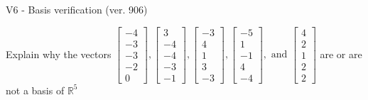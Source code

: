 \begin{exercise}
  \begin{exerciseTitle}V6 - Basis verification (ver. 906)\end{exerciseTitle}
  \begin{exerciseStatement}
    Explain why the vectors \(\left[\begin{array}{r}
-4 \\
-3 \\
-3 \\
-2 \\
0
\end{array}\right] , \left[\begin{array}{r}
3 \\
-4 \\
-4 \\
-3 \\
-1
\end{array}\right] , \left[\begin{array}{r}
-3 \\
4 \\
1 \\
3 \\
-3
\end{array}\right] , \left[\begin{array}{r}
-5 \\
1 \\
-1 \\
4 \\
-4
\end{array}\right] , \text{ and } \left[\begin{array}{r}
4 \\
2 \\
1 \\
2 \\
2
\end{array}\right]\) are or are not a basis of \(\mathbb{R}^5\)	



\end{exerciseStatement}
\end{exercise}

